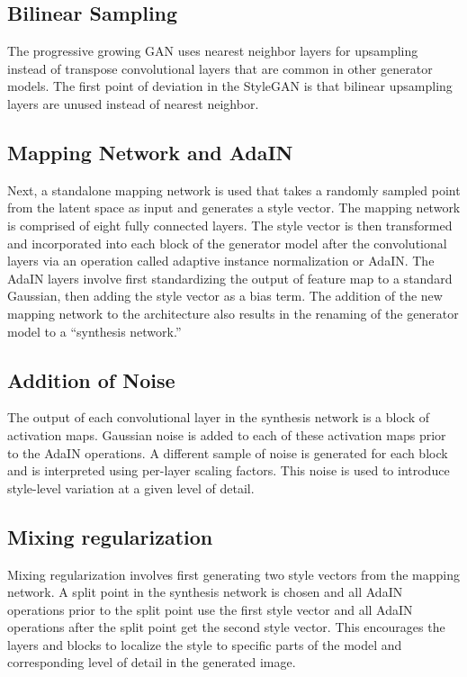 \begin{onehalfspace}
    \subsection{Bilinear Sampling}
    The progressive growing GAN uses nearest neighbor layers for upsampling instead of transpose convolutional layers that are common in other generator models. The first point of deviation in the StyleGAN is that bilinear upsampling layers are unused instead of nearest neighbor.

    \subsection{Mapping Network and AdaIN}
    Next, a standalone mapping network is used that takes a randomly sampled point from the latent space as input and generates a style vector. The mapping network is comprised of eight fully connected layers. The style vector is then transformed and incorporated into each block of the generator model after the convolutional layers via an operation called adaptive instance normalization or AdaIN. The AdaIN layers involve first standardizing the output of feature map to a standard Gaussian, then adding the style vector as a bias term. The addition of the new mapping network to the architecture also results in the renaming of the generator model to a “synthesis network.”

    
    \subsection{Addition of Noise}
    The output of each convolutional layer in the synthesis network is a block of activation maps. Gaussian noise is added to each of these activation maps prior to the AdaIN operations. A different sample of noise is generated for each block and is interpreted using per-layer scaling factors. This noise is used to introduce style-level variation at a given level of detail.


    \subsection{Mixing regularization}
    Mixing regularization involves first generating two style vectors from the mapping network. A split point in the synthesis network is chosen and all AdaIN operations prior to the split point use the first style vector and all AdaIN operations after the split point get the second style vector. This encourages the layers and blocks to localize the style to specific parts of the model and corresponding level of detail in the generated image.




\end{onehalfspace}

